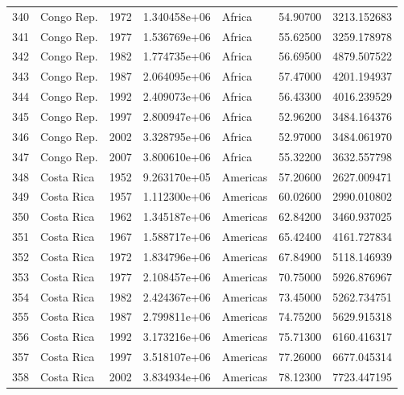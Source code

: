 \documentclass[
  letterpaper,
  DIV=11,
  numbers=noendperiod]{scrreprt}
\begin{document}
\begin{tabular}{llrrlrr}
340  &                Congo Rep. &  1972 &  1.340458e+06 &    Africa &  54.90700 &    3213.152683 \\
341  &                Congo Rep. &  1977 &  1.536769e+06 &    Africa &  55.62500 &    3259.178978 \\
342  &                Congo Rep. &  1982 &  1.774735e+06 &    Africa &  56.69500 &    4879.507522 \\
343  &                Congo Rep. &  1987 &  2.064095e+06 &    Africa &  57.47000 &    4201.194937 \\
344  &                Congo Rep. &  1992 &  2.409073e+06 &    Africa &  56.43300 &    4016.239529 \\
345  &                Congo Rep. &  1997 &  2.800947e+06 &    Africa &  52.96200 &    3484.164376 \\
346  &                Congo Rep. &  2002 &  3.328795e+06 &    Africa &  52.97000 &    3484.061970 \\
347  &                Congo Rep. &  2007 &  3.800610e+06 &    Africa &  55.32200 &    3632.557798 \\
348  &                Costa Rica &  1952 &  9.263170e+05 &  Americas &  57.20600 &    2627.009471 \\
349  &                Costa Rica &  1957 &  1.112300e+06 &  Americas &  60.02600 &    2990.010802 \\
350  &                Costa Rica &  1962 &  1.345187e+06 &  Americas &  62.84200 &    3460.937025 \\
351  &                Costa Rica &  1967 &  1.588717e+06 &  Americas &  65.42400 &    4161.727834 \\
352  &                Costa Rica &  1972 &  1.834796e+06 &  Americas &  67.84900 &    5118.146939 \\
353  &                Costa Rica &  1977 &  2.108457e+06 &  Americas &  70.75000 &    5926.876967 \\
354  &                Costa Rica &  1982 &  2.424367e+06 &  Americas &  73.45000 &    5262.734751 \\
355  &                Costa Rica &  1987 &  2.799811e+06 &  Americas &  74.75200 &    5629.915318 \\
356  &                Costa Rica &  1992 &  3.173216e+06 &  Americas &  75.71300 &    6160.416317 \\
357  &                Costa Rica &  1997 &  3.518107e+06 &  Americas &  77.26000 &    6677.045314 \\
358  &                Costa Rica &  2002 &  3.834934e+06 &  Americas &  78.12300 &    7723.447195 \\

\end{tabular}
\end{document}
